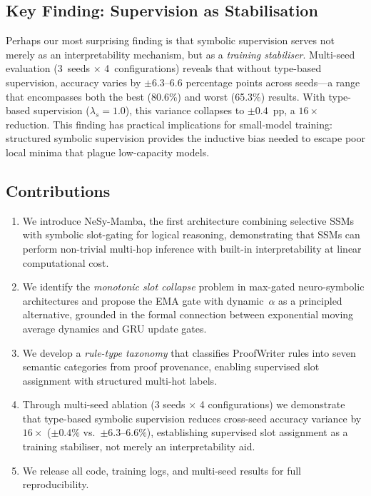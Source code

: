 \documentclass[conference]{IEEEtran}
\DeclareRobustCommand{\model}{NeSy-Mamba}
\begin{document}
\subsection{Key Finding: Supervision as Stabilisation}

Perhaps our most surprising finding is that symbolic supervision
serves not merely as an interpretability mechanism, but as a
\emph{training stabiliser}.  Multi-seed evaluation (3~seeds
$\times$ 4~configurations) reveals that without type-based
supervision, accuracy varies by $\pm 6.3$--$6.6$ percentage
points across seeds---a range that encompasses both the best
(80.6\%) and worst (65.3\%) results.  With type-based
supervision ($\lambda_s{=}1.0$), this variance collapses to
$\pm 0.4$~pp, a $16\times$ reduction.  This finding has
practical implications for small-model training: structured
symbolic supervision provides the inductive bias needed to
escape poor local minima that plague low-capacity models.

\subsection{Contributions}

\begin{enumerate}[nosep]
    \item We introduce \model{}, the first architecture combining
          selective SSMs with symbolic slot-gating for logical
          reasoning, demonstrating that SSMs can perform
          non-trivial multi-hop inference with built-in
          interpretability at linear computational cost.
    \item We identify the \emph{monotonic slot collapse} problem
          in max-gated neuro-symbolic architectures and propose
          the EMA gate with dynamic~$\alpha$ as a principled
          alternative, grounded in the formal connection between
          exponential moving average dynamics and GRU update gates.
    \item We develop a \emph{rule-type taxonomy} that classifies
          ProofWriter rules into seven semantic categories from
          proof provenance, enabling supervised slot assignment
          with structured multi-hot labels.
    \item Through multi-seed ablation (3 seeds $\times$ 4
          configurations) we demonstrate that type-based symbolic
          supervision reduces cross-seed accuracy variance by
          $16\times$ ($\pm 0.4\%$ vs.\ $\pm 6.3$--$6.6\%$),
          establishing supervised slot assignment as a training
          stabiliser, not merely an interpretability aid.
    \item We release all code, training logs, and multi-seed
          results for full reproducibility.
\end{enumerate}
\end{document}
